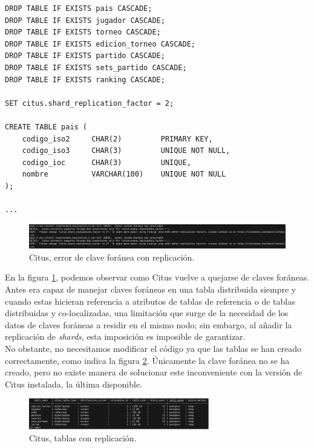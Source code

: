 \begin{verbatim}
DROP TABLE IF EXISTS pais CASCADE;
DROP TABLE IF EXISTS jugador CASCADE;
DROP TABLE IF EXISTS torneo CASCADE;
DROP TABLE IF EXISTS edicion_torneo CASCADE;
DROP TABLE IF EXISTS partido CASCADE;
DROP TABLE IF EXISTS sets_partido CASCADE;
DROP TABLE IF EXISTS ranking CASCADE;

SET citus.shard_replication_factor = 2;

CREATE TABLE pais (
    codigo_iso2     CHAR(2)         PRIMARY KEY,
    codigo_iso3     CHAR(3)         UNIQUE NOT NULL,
    codigo_ioc      CHAR(3)         UNIQUE,
    nombre          VARCHAR(100)    UNIQUE NOT NULL
);

...
\end{verbatim}

\begin{figure}[H]
\centering
\includegraphics[width=\textwidth]{fotos/citus/shard_rep_foreign_key_errro.png}
\caption{Citus, error de clave foránea con replicación.}
\label{fig:citus_shard_factor}
\end{figure}

En la figura \ref{fig:citus_shard_factor}, podemos observar como Citus vuelve a quejarse de claves foráneas. Antes era capaz de manejar claves foráneas en una tabla distribuida siempre y cuando estas hicieran referencia a atributos de tablas de referencia o de tablas distribuidas y co-localizadas, una limitación que surge de la necesidad de los datos de claves foráneas a residir en el mismo nodo; sin embargo, al añadir la replicación de \textit{shards}, esta imposición es imposible de garantizar. \\

No obstante, no necesitamos modificar el código ya que las tablas se han creado correctamente, como indica la figura \ref{fig:citus_shard_table}. Únicamente la clave foránea no se ha creado, pero no existe manera de solucionar este inconveniente con la versión de Citus instalada, la última disponible.

\begin{figure}[H]
\centering
\includegraphics[width=0.7\textwidth]{fotos/citus/shard_tablas.png}
\caption{Citus, tablas con replicación.}
\label{fig:citus_shard_table}
\end{figure}

